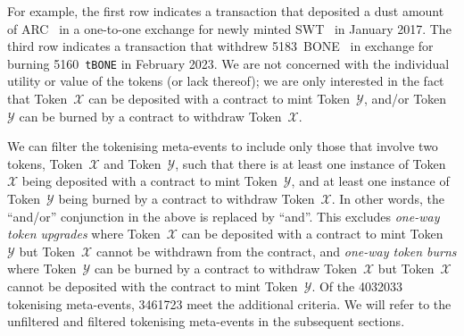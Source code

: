 For example, the first row indicates a transaction that deposited a
dust amount of ARC~\cite{arcade-city-xx} in a one-to-one exchange for
newly minted SWT~\cite{swarm-city-xx} in January 2017.  The third row
indicates a transaction that withdrew
\num{5183}~{BONE}~\cite{shiba-inu-xx} in exchange for burning
\num{5160}~\texttt{tBONE} in February 2023.  We are not concerned with
the individual utility or value of the tokens (or lack thereof); we
are only interested in the fact that Token~$\mathcal{X}$ can be
deposited with a contract to mint Token~$\mathcal{Y}$, and/or
Token~$\mathcal{Y}$ can be burned by a contract to withdraw
Token~$\mathcal{X}$.

We can filter the tokenising meta-events to include only those that
involve two tokens, Token~$\mathcal{X}$ and Token~$\mathcal{Y}$, such
that there is at least one instance of Token~$\mathcal{X}$ being
deposited with a contract to mint Token~$\mathcal{Y}$, and at least
one instance of Token~$\mathcal{Y}$ being burned by a contract to
withdraw Token~$\mathcal{X}$.  In other words, the ``and/or''
conjunction in the above is replaced by ``and''.  This excludes
\textit{one-way token upgrades} where Token~$\mathcal{X}$ can be
deposited with a contract to mint Token~$\mathcal{Y}$ but
Token~$\mathcal{X}$ cannot be withdrawn from the contract, and
\textit{one-way token burns} where Token~$\mathcal{Y}$ can be burned
by a contract to withdraw Token~$\mathcal{X}$ but Token~$\mathcal{X}$
cannot be deposited with the contract to mint Token~$\mathcal{Y}$.  Of
the \num{4032033} tokenising meta-events, \num{3461723} meet the
additional criteria.  We will refer to the unfiltered and filtered
tokenising meta-events in the subsequent sections.


